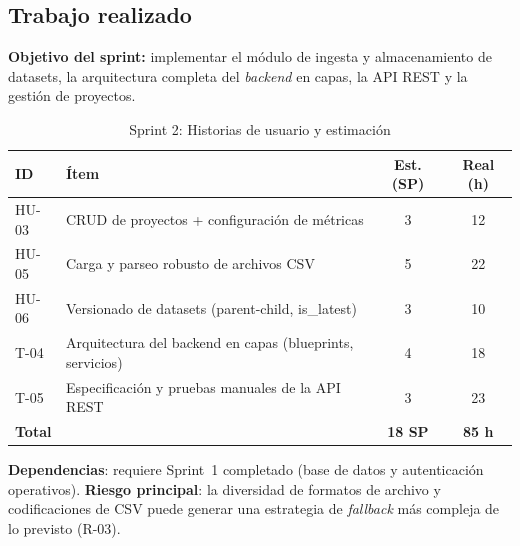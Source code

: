 \subsection{Trabajo realizado}

\textbf{Objetivo del sprint:} implementar el módulo de ingesta y
almacenamiento de datasets, la arquitectura completa del \emph{backend} en
capas, la \ac{API} \ac{REST} y la gestión de proyectos.

\begin{table}[htbp]
  \centering
  \small
  \caption{Sprint 2: Historias de usuario y estimación}
  \label{tab:sprint2-hu}
  \begin{tabularx}{\textwidth}{l X c c}
    \toprule
    \textbf{ID} & \textbf{Ítem} & \textbf{Est. (SP)} & \textbf{Real (h)} \\
    \midrule
    HU-03 & \ac{CRUD} de proyectos + configuración de métricas & 3 & 12 \\
    HU-05 & Carga y parseo robusto de archivos \ac{CSV} & 5 & 22 \\
    HU-06 & Versionado de datasets (parent-child, is\_latest) & 3 & 10 \\
    T-04  & Arquitectura del backend en capas (blueprints, servicios) & 4 & 18 \\
    T-05  & Especificación y pruebas manuales de la API \ac{REST} & 3 & 23 \\
    \midrule
    \multicolumn{2}{l}{\textbf{Total}} & \textbf{18 SP} & \textbf{85 h} \\
    \bottomrule
  \end{tabularx}
\end{table}

\textbf{Dependencias}: requiere Sprint~1 completado (base de datos y
autenticación operativos).  \textbf{Riesgo principal}: la diversidad de
formatos de archivo y codificaciones de \ac{CSV} puede generar una estrategia de
\emph{fallback} más compleja de lo previsto (R-03).

